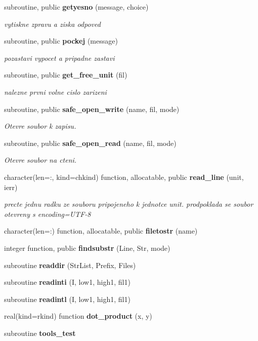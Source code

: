 \begin{DoxyCompactItemize}
\item 
subroutine, public {\bf getyesno} (message, choice)
\begin{DoxyCompactList}\small\item\em vytiskne zpravu a ziska odpoved \end{DoxyCompactList}\item 
subroutine, public {\bf pockej} (message)
\begin{DoxyCompactList}\small\item\em pozastavi vypocet a pripadne zastavi \end{DoxyCompactList}\item 
subroutine, public {\bf get\+\_\+free\+\_\+unit} (fil)
\begin{DoxyCompactList}\small\item\em nalezne prvni volne cislo zarizeni \end{DoxyCompactList}\item 
subroutine, public {\bf safe\+\_\+open\+\_\+write} (name, fil, mode)
\begin{DoxyCompactList}\small\item\em Otevre soubor k zapisu. \end{DoxyCompactList}\item 
subroutine, public {\bf safe\+\_\+open\+\_\+read} (name, fil, mode)
\begin{DoxyCompactList}\small\item\em Otevre soubor na cteni. \end{DoxyCompactList}\item 
character(len=\+:, kind=chkind) function, allocatable, public {\bf read\+\_\+line} (unit, ierr)
\begin{DoxyCompactList}\small\item\em precte jednu radku ze souboru pripojeneho k jednotce unit. prodpoklada se soubor otevreny s encoding=\textquotesingle{}U\+T\+F-\/8\textquotesingle{} \end{DoxyCompactList}\item 
character(len=\+:) function, allocatable, public {\bf filetostr} (name)
\item 
integer function, public {\bf findsubstr} (Line, Str, mode)
\item 
subroutine {\bf readdir} (Str\+List, Prefix, Files)
\item 
subroutine {\bf readinti} (I, low1, high1, fil1)
\item 
subroutine {\bf readintl} (I, low1, high1, fil1)
\item 
real(kind=rkind) function {\bf dot\+\_\+product} (x, y)
\item 
subroutine {\bf tools\+\_\+test}
\end{DoxyCompactItemize}

